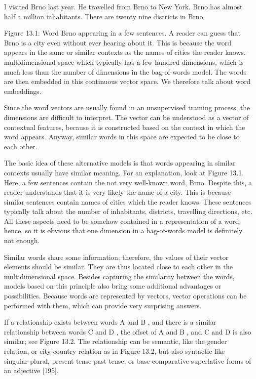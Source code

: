 \documentclass[10pt]{book}
\begin{document}
\begin{displayquote}
I visited Brno last year. He travelled from Brno to New York. Brno has almost half a million inhabitants. There are twenty nine districts in Brno.
\end{displayquote}

Figure 13.1: Word Brno appearing in a few sentences. A reader can guess that Brno is a city even without ever hearing about it. This is because the word appears in the same or similar contexts as the names of cities the reader knows.\\
multidimensional space which typically has a few hundred dimensions, which is much less than the number of dimensions in the bag-of-words model. The words are then embedded in this continuous vector space. We therefore talk about word embeddings.

Since the word vectors are usually found in an unsupervised training process, the dimensions are difficult to interpret. The vector can be understood as a vector of contextual features, because it is constructed based on the context in which the word appears. Anyway, similar words in this space are expected to be close to each other.

The basic idea of these alternative models is that words appearing in similar contexts usually have similar meaning. For an explanation, look at Figure 13.1. Here, a few sentences contain the not very well-known word, Brno. Despite this, a reader understands that it is very likely the name of a city. This is because similar sentences contain names of cities which the reader knows. These sentences typically talk about the number of inhabitants, districts, travelling directions, etc. All these aspects need to be somehow contained in a representation of a word; hence, so it is obvious that one dimension in a bag-of-words model is definitely not enough.

Similar words share some information; therefore, the values of their vector elements should be similar. They are thus located close to each other in the multidimensional space. Besides capturing the similarity between the words, models based on this principle also bring some additional advantages or possibilities. Because words are represented by vectors, vector operations can be performed with them, which can provide very surprising answers.

If a relationship exists between words A and B , and there is a similar relationship between words C and D , the offset of A and B , and C and D is also similar; see Figure 13.2. The relationship can be semantic, like the gender relation, or city-country relation as in Figure 13.2, but also syntactic like singular-plural, present tense-past tense, or base-comparative-superlative forms of an adjective [195].
\end{document}
